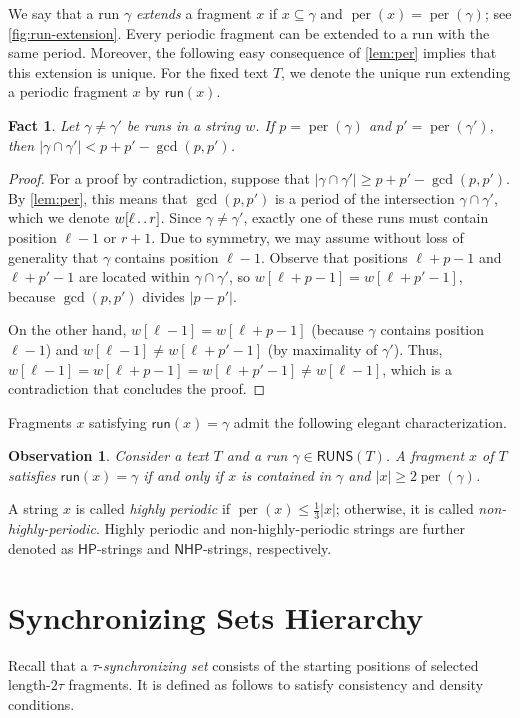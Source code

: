 \documentclass[a4paper]{article}
\newtheorem{fact}[theorem]{Fact}
\newtheorem{observation}[theorem]{Observation}
\theoremstyle{definition}
\theoremstyle{remark}
\newcommand{\N}{\mathsf{NHP}}
\newcommand{\HP}{\mathsf{HP}}
\newcommand{\sub}{\subseteq}
\newcommand{\dd}{\mathinner{\ldotp\ldotp}}
\DeclareMathOperator{\per}{per}
\newcommand{\RUNS}{\mathsf{RUNS}}
\newcommand{\run}{\mathsf{run}}
\begin{document}
We say that a run $\gamma$ \emph{extends} a fragment $x$ if $x\sub \gamma$ and $\per(x)=\per(\gamma)$; see \cref{fig:run-extension}.
Every periodic fragment can be extended to a run with the same period. Moreover, the following easy consequence of \cref{lem:per} implies that this extension is unique. For the fixed text $T$, we denote the unique run extending a periodic fragment $x$ by $\run(x)$.
\begin{fact}\label{fct:uni}
Let $\gamma\ne \gamma'$ be runs in a string $w$.
If $p=\per(\gamma)$ and $p'=\per(\gamma')$,
then $|\gamma \cap \gamma'| < p+p'-\gcd(p,p')$.
\end{fact}
\begin{proof}
For a proof by contradiction, suppose that  $|\gamma \cap \gamma'| \ge p+p'-\gcd(p,p')$.
By \cref{lem:per}, this means that $\gcd(p,p')$ is a period of the intersection $\gamma\cap \gamma'$, which we denote $w[\ell\dd r]$.
Since $\gamma\ne \gamma'$, exactly one of these runs must contain position $\ell-1$ or $r+1$.
Due to symmetry, we may assume without loss of generality that $\gamma$ contains position $\ell-1$.
Observe that positions $\ell+p-1$ and $\ell+p'-1$ are located within $\gamma\cap \gamma'$, so $w[\ell+p-1]=w[\ell+p'-1]$,
because $\gcd(p,p')$ divides $|p-p'|$.

On the other hand, $w[\ell-1]=w[\ell+p-1]$ (because $\gamma$ contains position $\ell-1$) and $w[\ell-1]\ne w[\ell+p'-1]$ (by maximality of $\gamma'$).
Thus, $w[\ell-1]=w[\ell+p-1]=w[\ell+p'-1]\ne w[\ell-1]$, which is a contradiction that concludes the proof.
\end{proof}

Fragments $x$ satisfying $\run(x)=\gamma$ admit the following elegant characterization.

\begin{observation}\label{obs:char}
Consider a text $T$ and a run $\gamma \in \RUNS(T)$.
A fragment $x$ of $T$ satisfies $\run(x)=\gamma$ if and only if $x$ is contained in $\gamma$
and $|x|\ge 2\per(\gamma)$.
\end{observation}

A string $x$ is called \emph{highly periodic} if $\per(x) \le \frac13|x|$; otherwise, it is called \emph{non-highly-periodic}.
Highly periodic and non-highly-periodic strings are further denoted as $\HP$-strings and $\N$-strings, respectively.

\section{Synchronizing Sets Hierarchy}\label{chp:lce}
Recall that a $\tau$-\emph{synchronizing set} consists of the starting positions of selected length-$2\tau$ fragments.
It is defined as follows to satisfy consistency and density conditions.
\end{document}
